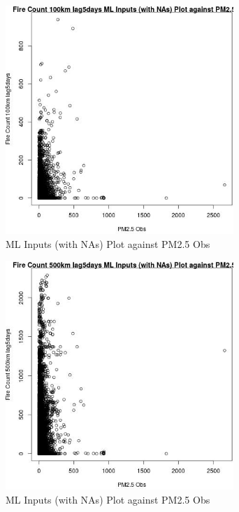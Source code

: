 \begin{figure} 
\centering  
\includegraphics[width=0.77\textwidth]{Code_Outputs/Report_ML_input_PM25_Step4_part_e_de_duplicated_aves_compiled_2019-05-21wNAs_Fire_Count_100km_lag5daysvPM25_Obs.jpg} 
\caption{\label{fig:Report_ML_input_PM25_Step4_part_e_de_duplicated_aves_compiled_2019-05-21wNAsFire_Count_100km_lag5daysvPM25_Obs}ML Inputs (with NAs) Plot against PM2.5 Obs} 
\end{figure} 
 

\begin{figure} 
\centering  
\includegraphics[width=0.77\textwidth]{Code_Outputs/Report_ML_input_PM25_Step4_part_e_de_duplicated_aves_compiled_2019-05-21wNAs_Fire_Count_500km_lag5daysvPM25_Obs.jpg} 
\caption{\label{fig:Report_ML_input_PM25_Step4_part_e_de_duplicated_aves_compiled_2019-05-21wNAsFire_Count_500km_lag5daysvPM25_Obs}ML Inputs (with NAs) Plot against PM2.5 Obs} 
\end{figure} 
 

